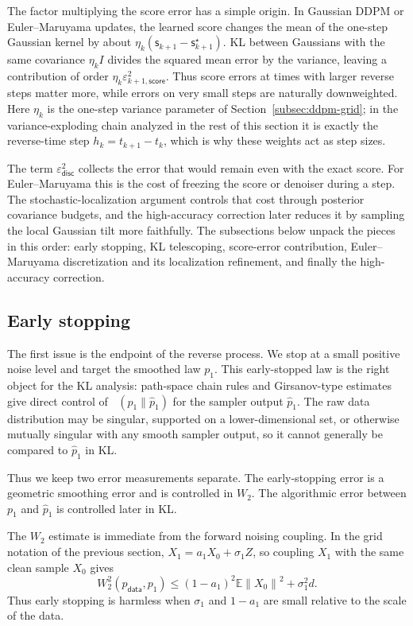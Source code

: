 \documentclass[10pt,a4paper]{amsart}
\numberwithin{equation}{section}
\DeclareMathOperator{\KL}{D_{\mathsf{KL}}}
\newcommand{\E}{\mathbb{E}}
\newcommand{\Id}{I}
\newcommand{\wh}[1]{\widehat{#1}}
\newcommand{\eps}{\varepsilon}
\newcommand{\norm}[1]{\left\lVert #1 \right\rVert}
\newcommand{\pdata}{p_{\mathsf{data}}}
\newcommand{\sstar}{\mathsf{s}^{\star}}
\newcommand{\score}{\mathsf{s}}
\newcommand{\epsdisc}{\varepsilon_{\mathsf{disc}}}
\begin{document}
The factor multiplying the score error has a simple origin.  In Gaussian DDPM
or Euler--Maruyama updates, the learned score changes the mean of the one-step
Gaussian kernel by about $\eta_k(\score_{k+1}-\sstar_{k+1})$.  KL between
Gaussians with the same covariance $\eta_k\Id$ divides the squared mean error by
the variance, leaving a contribution of order
$\eta_k\eps_{k+1,\mathsf{score}}^2$.  Thus score errors at times with
larger reverse steps matter more, while errors on very small steps are naturally
downweighted.  Here $\eta_k$ is the one-step variance parameter of
Section~\ref{subsec:ddpm-grid}; in the variance-exploding chain analyzed in the
rest of this section it is exactly the reverse-time step $h_k=t_{k+1}-t_k$, which
is why these weights act as step sizes.

The term $\epsdisc^2$ collects the error that would remain even
with the exact score.  For Euler--Maruyama this is the cost of freezing the score
or denoiser during a step.  The stochastic-localization argument controls that
cost through posterior covariance budgets, and the high-accuracy correction later
reduces it by sampling the local Gaussian tilt more faithfully.  The subsections
below unpack the pieces in this order: early stopping, KL telescoping,
score-error contribution, Euler--Maruyama discretization and its localization
refinement, and finally the high-accuracy correction.

\subsection{Early stopping}

The first issue is the endpoint of the reverse process.  We stop at a small
positive noise level and target the smoothed law $p_1$.  This
early-stopped law is the right object for the KL analysis: path-space chain
rules and Girsanov-type estimates give direct control of $\KL(p_1\|\wh p_1)$
for the sampler output $\wh p_1$.  The raw data distribution may be singular,
supported on a lower-dimensional set, or otherwise mutually singular with any
smooth sampler output, so it cannot generally be compared to $\wh p_1$ in KL.

Thus we keep two error measurements separate.  The early-stopping error is a
geometric smoothing error and is controlled in $W_2$.  The algorithmic error
between $p_1$ and $\wh p_1$ is controlled later in KL.

The $W_2$ estimate is immediate from the forward noising coupling.  In the
grid notation of the previous section, $X_1=a_1X_0+\sigma_1Z$, so coupling
$X_1$ with the same clean sample $X_0$ gives
\begin{equation}\label{eq:early-stop-w2}
    W_2^2(\pdata,p_1)
    \leq
    (1-a_1)^2\E\norm{X_0}^2+\sigma_1^2d.
\end{equation}
Thus early stopping is harmless when $\sigma_1$ and $1-a_1$ are small relative
to the scale of the data.
\end{document}
